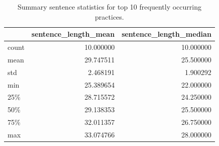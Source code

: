 \begin{table}[!ht]
	\centering
	\begin{tabular}{lrr}
		\toprule
		{} &  sentence\_length\_mean &  sentence\_length\_median \\
		\midrule
		count &             10.000000 &               10.000000 \\
		mean  &             29.747511 &               25.500000 \\
		std   &              2.468191 &                1.900292 \\
		min   &             25.389654 &               22.000000 \\
		25\%   &             28.715572 &               24.250000 \\
		50\%   &             29.138353 &               25.500000 \\
		75\%   &             32.011357 &               26.750000 \\
		max   &             33.074766 &               28.000000 \\
		\bottomrule
	\end{tabular}
	\caption{Summary sentence statistics for top 10 frequently occurring practices.}
	\label{tab:summary_top_10_practices}
\end{table}

